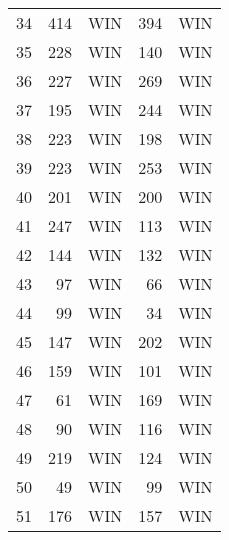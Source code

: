 \begin{tabular}{rrrrr}
        34 &        414 &        WIN &        394 &        WIN \\

        35 &        228 &        WIN &        140 &        WIN \\

        36 &        227 &        WIN &        269 &        WIN \\

        37 &        195 &        WIN &        244 &        WIN \\

        38 &        223 &        WIN &        198 &        WIN \\

        39 &        223 &        WIN &        253 &        WIN \\

        40 &        201 &        WIN &        200 &        WIN \\

        41 &        247 &        WIN &        113 &        WIN \\

        42 &        144 &        WIN &        132 &        WIN \\

        43 &         97 &        WIN &         66 &        WIN \\

        44 &         99 &        WIN &         34 &        WIN \\

        45 &        147 &        WIN &        202 &        WIN \\

        46 &        159 &        WIN &        101 &        WIN \\

        47 &         61 &        WIN &        169 &        WIN \\

        48 &         90 &        WIN &        116 &        WIN \\

        49 &        219 &        WIN &        124 &        WIN \\

        50 &         49 &        WIN &         99 &        WIN \\

        51 &        176 &        WIN &        157 &        WIN \\


\end{tabular}
